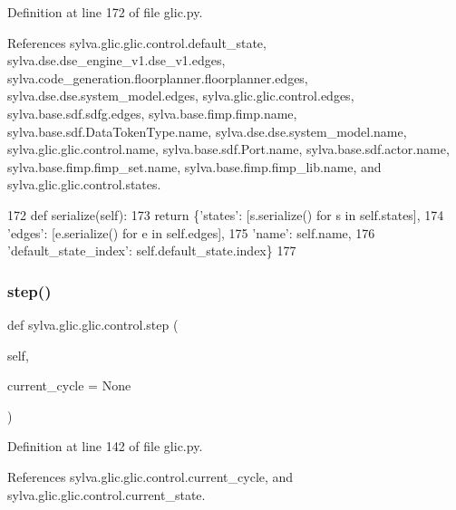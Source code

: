 Definition at line 172 of file glic.\+py.



References sylva.\+glic.\+glic.\+control.\+default\+\_\+state, sylva.\+dse.\+dse\+\_\+engine\+\_\+v1.\+dse\+\_\+v1.\+edges, sylva.\+code\+\_\+generation.\+floorplanner.\+floorplanner.\+edges, sylva.\+dse.\+dse.\+system\+\_\+model.\+edges, sylva.\+glic.\+glic.\+control.\+edges, sylva.\+base.\+sdf.\+sdfg.\+edges, sylva.\+base.\+fimp.\+fimp.\+name, sylva.\+base.\+sdf.\+Data\+Token\+Type.\+name, sylva.\+dse.\+dse.\+system\+\_\+model.\+name, sylva.\+glic.\+glic.\+control.\+name, sylva.\+base.\+sdf.\+Port.\+name, sylva.\+base.\+sdf.\+actor.\+name, sylva.\+base.\+fimp.\+fimp\+\_\+set.\+name, sylva.\+base.\+fimp.\+fimp\+\_\+lib.\+name, and sylva.\+glic.\+glic.\+control.\+states.


\begin{DoxyCode}
172     \textcolor{keyword}{def }serialize(self):
173       \textcolor{keywordflow}{return} \{\textcolor{stringliteral}{'states'}: [s.serialize() \textcolor{keywordflow}{for} s \textcolor{keywordflow}{in} self.states],
174               \textcolor{stringliteral}{'edges'}: [e.serialize() \textcolor{keywordflow}{for} e \textcolor{keywordflow}{in} self.edges],
175               \textcolor{stringliteral}{'name'}: self.name,
176               \textcolor{stringliteral}{'default\_state\_index'}: self.default\_state.index\}
177 
\end{DoxyCode}
\mbox{\label{classsylva_1_1glic_1_1glic_1_1control_aea52fc110901323d58833de74918965e}} 
\subsubsection{\texorpdfstring{step()}{step()}}
{\footnotesize\ttfamily def sylva.\+glic.\+glic.\+control.\+step (\begin{DoxyParamCaption}\item[{}]{self,  }\item[{}]{current\+\_\+cycle = {\ttfamily None} }\end{DoxyParamCaption})}



Definition at line 142 of file glic.\+py.



References sylva.\+glic.\+glic.\+control.\+current\+\_\+cycle, and sylva.\+glic.\+glic.\+control.\+current\+\_\+state.


